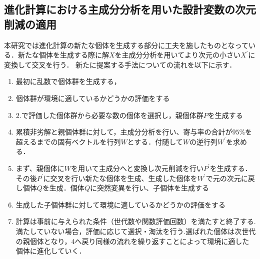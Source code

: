 \documentclass[11pt,a4j,notitlepage]{jsarticle}
\begin{document}
\subsection{進化計算における主成分分析を用いた設計変数の次元削減の適用}
\vspace{-1.0zh}
本研究では進化計算の新たな個体を生成する部分に工夫を施したものとなっている．新たな個体を生成する際に解$X$を主成分分析を用いてより次元の小さい$X^{\prime}$に変換して交叉を行う．
新たに提案する手法についての流れを以下に示す．
\vspace{-1.5zh}
\begin{enumerate}
  \item 最初に乱数で個体群を生成する，
  \item 個体群が環境に適しているかどうかの評価をする
  \item 2.で評価した個体群から必要な数の個体を選択し，親個体群$P$を生成する
  \item 累積非劣解と親個体群に対して，主成分分析を行い、寄与率の合計が$95\%$を超えるまでの固有ベクトルを行列$W$とする．付随して$W$の逆行列$W^{\prime}$を求める．
  \item まず、親個体に$W$を用いて主成分へと変換し次元削減を行い$P^{\prime}$を生成する．その後$P^{\prime}$に交叉を行い新たな個体を生成、生成した個体を$W^{\prime}$で元の次元に戻し個体$Q$を生成．個体$Q$に突然変異を行い、子個体を生成する
  \item 生成した子個体群に対して環境に適しているかどうかの評価をする
  \item 計算は事前に与えられた条件（世代数や関数評価回数）を満たすと終了する.満たしていない場合，評価に応じて選択・淘汰を行う.選ばれた個体は次世代の親個体となり，4へ戻り同様の流れを繰り返すことによって環境に適した個体に進化していく．
\end{enumerate}
\end{document}
